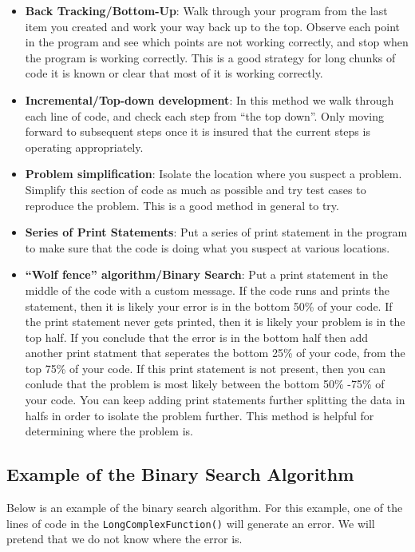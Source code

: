 \documentclass[
]{book}
\begin{document}
\begin{itemize}
\item
  \textbf{Back Tracking/Bottom-Up}: Walk through your program from the last item you created and work your way back up to the top. Observe each point in the program and see which points are not working correctly, and stop when the program is working correctly. This is a good strategy for long chunks of code it is known or clear that most of it is working correctly.
\item
  \textbf{Incremental/Top-down development}: In this method we walk through each line of code, and check each step from ``the top down''. Only moving forward to subsequent steps once it is insured that the current steps is operating appropriately.
\item
  \textbf{Problem simplification}: Isolate the location where you suspect a problem. Simplify this section of code as much as possible and try test cases to reproduce the problem. This is a good method in general to try.
\item
  \textbf{Series of Print Statements}: Put a series of print statement in the program to make sure that the code is doing what you suspect at various locations.
\item
  \textbf{``Wolf fence'' algorithm/Binary Search}: Put a print statement in the middle of the code with a custom message. If the code runs and prints the statement, then it is likely your error is in the bottom 50\% of your code. If the print statement never gets printed, then it is likely your problem is in the top half. If you conclude that the error is in the bottom half then add another print statment that seperates the bottom 25\% of your code, from the top 75\% of your code. If this print statement is not present, then you can conlude that the problem is most likely between the bottom 50\% -75\% of your code. You can keep adding print statements further splitting the data in halfs in order to isolate the problem further. This method is helpful for determining where the problem is.
\end{itemize}

\hypertarget{example-of-the-binary-search-algorithm}{%
\subsection{Example of the Binary Search Algorithm}\label{example-of-the-binary-search-algorithm}}

Below is an example of the binary search algorithm. For this example, one of the lines of code in the \texttt{LongComplexFunction()} will generate an error. We will pretend that we do not know where the error is.
\end{document}
